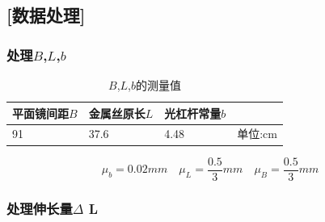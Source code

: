 \documentclass[UTF8]{article}
\begin{document}
	\subsection*{[数据处理]}
	

\subsubsection*{处理$B$,$L$,$b$}
\begin{table}[h]
	\centering
	\begin{tabular}{|l|l|l|l|}
		\hline
		平面镜间距$B$ & 金属丝原长$L$ & 光杠杆常量$b$ &      \\ \hline
		91     & 37.6   & 4.48  & 单位:cm \\ \hline
	\end{tabular}
	\caption{$B$,$L$,$b$的测量值}
\end{table}
\[\mu_{b}=0.02mm \quad\mu_L = \frac{0.5}{3}mm \quad\mu_B = \frac{0.5}{3}mm\]
\subsubsection*{处理伸长量$\Delta$ L}
\end{document}
